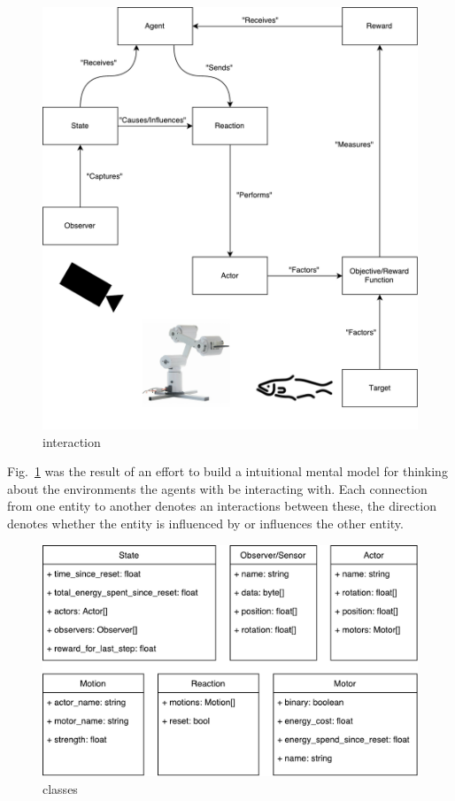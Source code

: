 \begin{figure}
\centering
\includegraphics[width=.9\linewidth]{figures/neodroid_classes_verbs.pdf}
\caption{interaction}
\label{fig:interaction}
\end{figure}

Fig.~\ref{fig:interaction} was the result of an effort to build a intuitional mental model for thinking about the environments the agents with be interacting with. Each connection from one entity to another denotes an interactions between these, the direction denotes whether the entity is influenced by or influences the other entity.


\begin{figure}
\centering
\includegraphics[width=.8\linewidth]{figures/neodroid_classes.pdf}
\caption{classes}
\label{fig:classes}
\end{figure}

